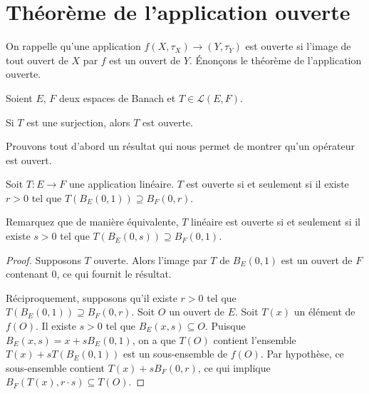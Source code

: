 \section{Théorème de l'application ouverte}
On rappelle qu'une application $f(X, \tau_X)\to(Y, \tau_Y)$ est ouverte
si l'image de tout ouvert de $X$ par $f$ est un ouvert de $Y$.
\'{E}nonçons le théorème de l'application ouverte.

\begin{thm}
  Soient $E$, $F$ deux espaces de Banach et $T\in\mathscr{L}(E, F)$.

  Si $T$ est une surjection, alors $T$ est ouverte.
\end{thm}

Prouvons tout d'abord un résultat qui nous permet de montrer
qu'un opérateur est ouvert.
\begin{prop}
  Soit $T: E\to F$ une application linéaire. $T$ est ouverte si et seulement
  si il existe $r>0$ tel que $T\left(B_E(0, 1)\right)\supseteq B_F(0, r)$.
\end{prop}

Remarquez que de manière équivalente, $T$ linéaire est ouverte si et seulement
si il existe $s>0$ tel que $T\left(B_E(0, s)\right)\supseteq B_F(0, 1)$.

\begin{proof}
  Supposons $T$ ouverte. Alors l'image par $T$ de $B_E(0, 1)$ est un ouvert
  de $F$ contenant $0$, ce qui fournit le résultat.

  Réciproquement, supposons qu'il existe $r>0$ tel que
  $T\left(B_E(0, 1)\right)\supseteq B_F(0, r)$. Soit $O$ un ouvert de $E$.
  Soit $T(x)$ un élément de $f(O)$. Il existe $s>0$ tel que $B_E(x, s)%
  \subseteq O$. Puisque $B_E(x, s) = x + s B_E(0, 1)$, on a que $T(O)$ contient
  l'ensemble $T(x) + s T(B_E(0, 1))$ est un sous-ensemble de $f(O)$.
  Par hypothèse, ce sous-ensemble contient $T(x) + s B_F(0, r)$, ce qui
  implique $B_F(T(x), r\cdot{}s)\subseteq T(O)$.
\end{proof}

